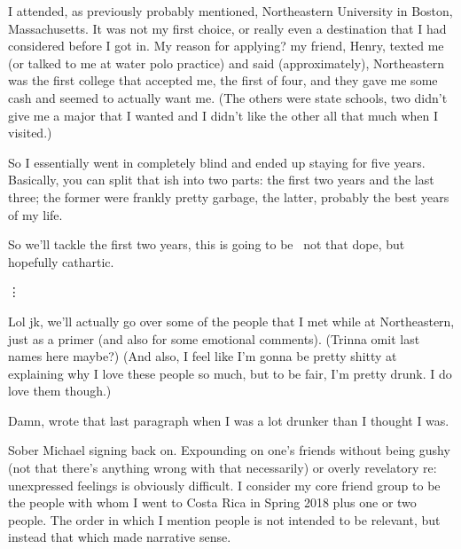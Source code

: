 \documentclass[./butidigress.tex]{subfiles}
\begin{document}
I attended, as previously probably mentioned, Northeastern University in Boston, Massachusetts.
It was not my first choice, or really even a destination that I had considered before I got in.
My reason for applying? my friend, Henry, texted me (or talked to me at water polo practice) and said (approximately), 
Northeastern was the first college that accepted me, the first of four, and they gave me some cash and seemed to actually want me.
(The others were state schools, two didn't give me a major that I wanted and I didn't like the other all that much when I visited.)

So I essentially went in completely blind and ended up staying for five years.
Basically, you can split that ish into two parts: the first two years and the last three; the former were frankly pretty garbage, the latter, probably the best years of my life.

So we'll tackle the first two years, this is going to be \lips\ not that dope, but hopefully cathartic.

\hspace{2em}\vdots

Lol jk, we'll actually go over some of the people that I met while at Northeastern, just as a primer (and also for some emotional comments).
(Trinna omit last names here maybe?)
(And also, I feel like I'm gonna be pretty shitty at explaining why I love these people so much, but to be fair, I'm pretty drunk.
I do love them though.)

Damn, wrote that last paragraph when I was a lot drunker than I thought I was.

\entryskip

Sober Michael signing back on.
Expounding on one's friends without being gushy (not that there's anything wrong with that necessarily) or overly revelatory re: unexpressed feelings is obviously difficult.
I consider my core friend group to be the people with whom I went to Costa Rica in Spring 2018 plus one or two people.
The order in which I mention people is not intended to be relevant, but instead that which made narrative sense.
\end{document}
